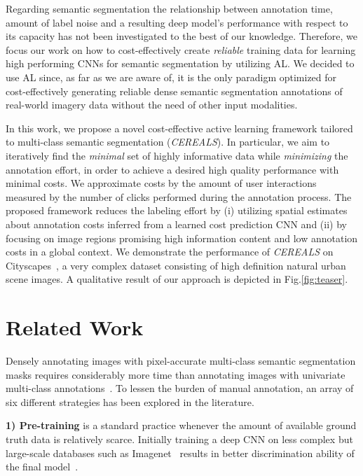 \documentclass{bmvc2k}
\begin{document}
Regarding semantic segmentation the relationship between annotation time, amount of label noise and a resulting deep model's performance with respect to its capacity has not been investigated to the best of our knowledge. Therefore, we focus our work on how to cost-effectively create \textit{reliable} training data for learning high performing CNNs for semantic segmentation by utilizing AL. We decided to use AL since, as far as we are aware of, it is the only paradigm optimized for cost-effectively generating reliable dense semantic segmentation annotations of real-world imagery data without the need of other input modalities.

In this work, we propose a novel cost-effective active learning framework tailored to multi-class semantic segmentation (\textit{CEREALS}). In particular, we aim to iteratively find the {\it minimal} set of highly informative data while {\it minimizing} the annotation effort, in order to achieve a desired high quality performance with minimal costs. We approximate costs by the amount of user interactions measured by the number of clicks performed during the annotation process. The proposed framework reduces the labeling effort by (i) utilizing spatial estimates about annotation costs inferred from a learned cost prediction CNN and (ii) by focusing on image regions promising high information content and low annotation costs in a global context. We demonstrate the performance of \textit{CEREALS} on Cityscapes~\cite{DBLP:conf/cvpr/CordtsORREBFRS16}, a very complex dataset consisting of high definition natural urban scene images. A qualitative result of our approach is depicted in Fig.\ref{fig:teaser}.\label{sec:intro}
\section{Related Work}
 
Densely annotating images with pixel-accurate multi-class semantic segmentation masks requires considerably more time than annotating images with univariate multi-class annotations~\cite{DBLP:conf/cvpr/XieKSG16}. To lessen the burden of manual annotation, an array of six different strategies has been explored in the literature. 

{\bf1) Pre-training} is a standard practice whenever the amount of available ground truth data is relatively scarce. Initially training a deep CNN on less complex but large-scale databases such as Imagenet~\cite{DBLP:conf/cvpr/DengDSLL009} results in better discrimination ability of the final model~\cite{DBLP:conf/cvpr/GirshickDDM14, DBLP:conf/cvpr/OquabBLS14, DBLP:journals/corr/HuhAE16, DBLP:conf/iccv/SunSSG17}.
\end{document}
